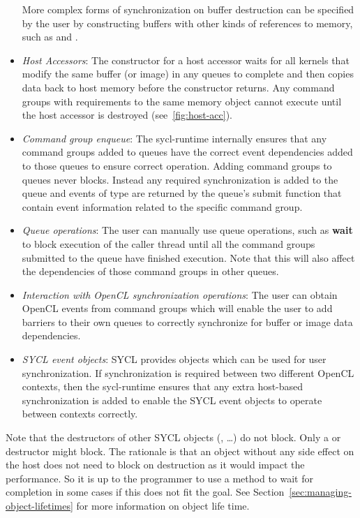 \begin{itemize}
    More complex forms of synchronization on buffer destruction
    can be specified by the user by constructing buffers with other kinds of
    references to memory, such as  and .
  \item
    \emph{Host Accessors}: The constructor for a host accessor waits for
    all kernels that modify the same buffer (or image) in any queues to complete
    and then copies data back to host memory before the constructor returns. Any
    command groups with requirements to the same memory object cannot execute
    until the host accessor is destroyed (see~\ref{fig:host-acc}).
  \item
    \emph{Command group enqueue}: The \gls{sycl-runtime} internally ensures that
    any command groups added to queues have the correct event dependencies added
    to those queues to ensure correct operation. Adding command groups to queues
    never blocks. Instead any required synchronization is added to the queue and
    events of type  are returned by the queue's submit
    function that contain event information related to the specific command
    group.
  \item 
    \emph{Queue operations}: The user can manually use queue operations, such
    as \textbf{wait} to block execution of the caller thread until all the
    command groups submitted to the queue have finished execution. Note that
    this will also affect the dependencies of those command groups in other
    queues.
  \item
    \emph{Interaction with OpenCL synchronization operations}: The user can
    obtain OpenCL events from command groups which will
    enable the user to add \glspl{barrier} to their own queues to correctly
    synchronize for buffer or image data dependencies.
  \item
   \emph{SYCL event objects}: SYCL provides  objects
   which can be used for user synchronization. If synchronization is required
   between two different OpenCL contexts, then the \gls{sycl-runtime} ensures that
   any extra host-based synchronization is added to enable the SYCL event
   objects to operate between contexts correctly.

 \end{itemize}

Note that the destructors of other SYCL objects
(, \ldots) do
not block. Only a  or
 destructor might block. The rationale is
that an object without any side effect on the host does not need to
block on destruction as it would impact the performance. So it is up
to the programmer to use a method to wait for completion in some
cases if this does not fit the goal.
See Section~\ref{sec:managing-object-lifetimes} for more information
on object life time.

